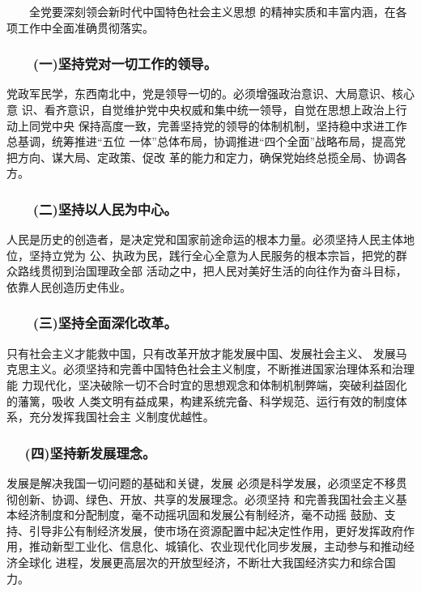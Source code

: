 \documentclass[11pt]{ctexart}
\begin{document}
{{{{　　全党要深刻领会新时代中国特色社会主义思想
的精神实质和丰富内涵，在各项工作中全面准确贯彻落实。

\subsubsection{　　(一)坚持党对一切工作的领导。}
\label{sec:org0669b29}

党政军民学，东西南北中，党是领导一切的。必须增强政治意识、大局意识、核心意
识、看齐意识，自觉维护党中央权威和集中统一领导，自觉在思想上政治上行动上同党中央
保持高度一致，完善坚持党的领导的体制机制，坚持稳中求进工作总基调，统筹推进“五位
一体”总体布局，协调推进“四个全面”战略布局，提高党把方向、谋大局、定政策、促改
革的能力和定力，确保党始终总揽全局、协调各方。

\subsubsection{　　(二)坚持以人民为中心。}
\label{sec:org61eb841}

人民是历史的创造者，是决定党和国家前途命运的根本力量。必须坚持人民主体地位，坚持立党为
公、执政为民，践行全心全意为人民服务的根本宗旨，把党的群众路线贯彻到治国理政全部
活动之中，把人民对美好生活的向往作为奋斗目标，依靠人民创造历史伟业。

\subsubsection{　　(三)坚持全面深化改革。}
\label{sec:org5cc7862}

只有社会主义才能救中国，只有改革开放才能发展中国、发展社会主义、
发展马克思主义。必须坚持和完善中国特色社会主义制度，不断推进国家治理体系和治理能
力现代化，坚决破除一切不合时宜的思想观念和体制机制弊端，突破利益固化的藩篱，吸收
人类文明有益成果，构建系统完备、科学规范、运行有效的制度体系，充分发挥我国社会主
义制度优越性。

\subsubsection{　  (四)坚持新发展理念。}
\label{sec:org382e48d}

发展是解决我国一切问题的基础和关键，发展
必须是科学发展，必须坚定不移贯彻创新、协调、绿色、开放、共享的发展理念。必须坚持
和完善我国社会主义基本经济制度和分配制度，毫不动摇巩固和发展公有制经济，毫不动摇
鼓励、支持、引导非公有制经济发展，使市场在资源配置中起决定性作用，更好发挥政府作
用，推动新型工业化、信息化、城镇化、农业现代化同步发展，主动参与和推动经济全球化
进程，发展更高层次的开放型经济，不断壮大我国经济实力和综合国力。

}}}}
\end{document}

